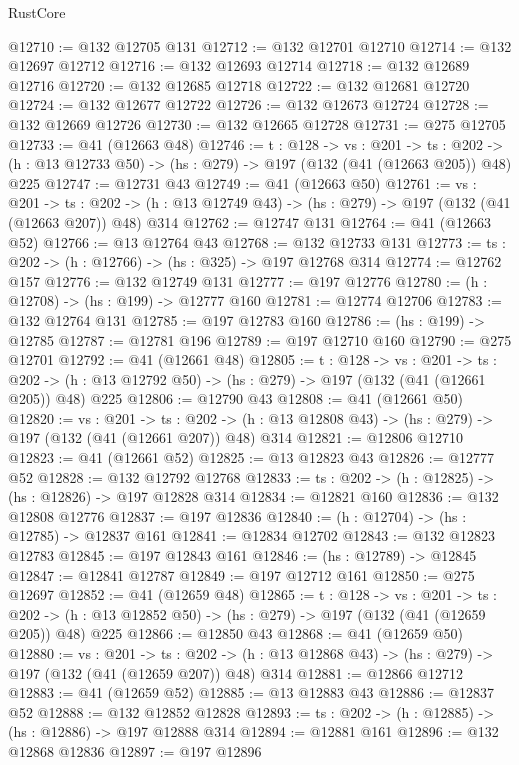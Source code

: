 \begin{lexlean}{RustCore}
\begin{coremodule}
@12710 := @132 @12705 @131
@12712 := @132 @12701 @12710
@12714 := @132 @12697 @12712
@12716 := @132 @12693 @12714
@12718 := @132 @12689 @12716
@12720 := @132 @12685 @12718
@12722 := @132 @12681 @12720
@12724 := @132 @12677 @12722
@12726 := @132 @12673 @12724
@12728 := @132 @12669 @12726
@12730 := @132 @12665 @12728
@12731 := @275 @12705
@12733 := @41 (@12663 @48)
@12746 := {t : @128} ->
  {vs : @201} ->
  {ts : @202} -> (h : @13 @12733 @50) -> (hs : @279) -> @197 (@132 (@41 (@12663 @205)) @48) @225
@12747 := @12731 @43
@12749 := @41 (@12663 @50)
@12761 := {vs : @201} ->
  {ts : @202} -> (h : @13 @12749 @43) -> (hs : @279) -> @197 (@132 (@41 (@12663 @207)) @48) @314
@12762 := @12747 @131
@12764 := @41 (@12663 @52)
@12766 := @13 @12764 @43
@12768 := @132 @12733 @131
@12773 := {ts : @202} -> (h : @12766) -> (hs : @325) -> @197 @12768 @314
@12774 := @12762 @157
@12776 := @132 @12749 @131
@12777 := @197 @12776
@12780 := (h : @12708) -> (hs : @199) -> @12777 @160
@12781 := @12774 @12706
@12783 := @132 @12764 @131
@12785 := @197 @12783 @160
@12786 := (hs : @199) -> @12785
@12787 := @12781 @196
@12789 := @197 @12710 @160
@12790 := @275 @12701
@12792 := @41 (@12661 @48)
@12805 := {t : @128} ->
  {vs : @201} ->
  {ts : @202} -> (h : @13 @12792 @50) -> (hs : @279) -> @197 (@132 (@41 (@12661 @205)) @48) @225
@12806 := @12790 @43
@12808 := @41 (@12661 @50)
@12820 := {vs : @201} ->
  {ts : @202} -> (h : @13 @12808 @43) -> (hs : @279) -> @197 (@132 (@41 (@12661 @207)) @48) @314
@12821 := @12806 @12710
@12823 := @41 (@12661 @52)
@12825 := @13 @12823 @43
@12826 := @12777 @52
@12828 := @132 @12792 @12768
@12833 := {ts : @202} -> (h : @12825) -> (hs : @12826) -> @197 @12828 @314
@12834 := @12821 @160
@12836 := @132 @12808 @12776
@12837 := @197 @12836
@12840 := (h : @12704) -> (hs : @12785) -> @12837 @161
@12841 := @12834 @12702
@12843 := @132 @12823 @12783
@12845 := @197 @12843 @161
@12846 := (hs : @12789) -> @12845
@12847 := @12841 @12787
@12849 := @197 @12712 @161
@12850 := @275 @12697
@12852 := @41 (@12659 @48)
@12865 := {t : @128} ->
  {vs : @201} ->
  {ts : @202} -> (h : @13 @12852 @50) -> (hs : @279) -> @197 (@132 (@41 (@12659 @205)) @48) @225
@12866 := @12850 @43
@12868 := @41 (@12659 @50)
@12880 := {vs : @201} ->
  {ts : @202} -> (h : @13 @12868 @43) -> (hs : @279) -> @197 (@132 (@41 (@12659 @207)) @48) @314
@12881 := @12866 @12712
@12883 := @41 (@12659 @52)
@12885 := @13 @12883 @43
@12886 := @12837 @52
@12888 := @132 @12852 @12828
@12893 := {ts : @202} -> (h : @12885) -> (hs : @12886) -> @197 @12888 @314
@12894 := @12881 @161
@12896 := @132 @12868 @12836
@12897 := @197 @12896

\end{coremodule}
\end{lexlean}
